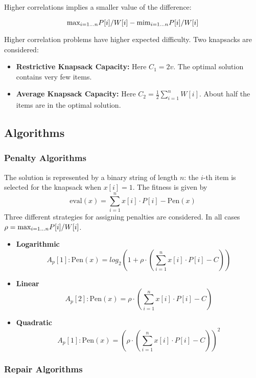 \documentclass[../main.tex]{subfiles}
\begin{document}
Higher correlations implies a smaller value of the difference:

\begin{equation}
\text{max}_{i=1 \mathellipsis n} { P[i]/W[i]} - \text{mim}_{i=1 \mathellipsis n} { P[i]/W[i]}
\end{equation}

Higher correlation problems have higher expected difficulty. Two knapsacks are considered:

\begin{itemize}
	\item \textbf{Restrictive Knapsack Capacity:} Here $C_1 = 2v$. The optimal solution contains very few items.
	\item \textbf{Average Knapsack Capacity:} Here $C_2 = \frac{1}{2} \sum^n_{i=1}W[i]$. About half the items are in
	the optimal solution.
\end{itemize}

\subsection{Algorithms}

\subsubsection{Penalty Algorithms}

The solution is represented by a binary string of length $n$: the $i$-th item is selected for the knapsack when $x[i] =
1$. The fitness is given by
\begin{equation}
\text{eval}(x) = \sum^n_{i=1} x[i] \cdot P[i] - \text{Pen}(x)
\end{equation}
Three different strategies for assigning penalties are considered. In all cases $\rho = \text{max}_{i=1 \mathellipsis
n} { P[i]/W[i]}$.

\begin{itemize}
	\item \textbf{Logarithmic} \\
	\[
	A_p[1]: \text{Pen}(x) = log_2(1 + \rho \cdot (\sum^n_{i=1} x[i] \cdot P[i] - C))
	\]
	\item \textbf{Linear}
	\[
	A_p[2]: \text{Pen}(x) = \rho \cdot (\sum^n_{i=1} x[i] \cdot P[i] - C)
	\]
	\item \textbf{Quadratic}
	\[
	A_p[1]: \text{Pen}(x) = (\rho \cdot (\sum^n_{i=1} x[i] \cdot P[i] - C))^2
	\]
\end{itemize}


\subsubsection{Repair Algorithms}
\end{document}
